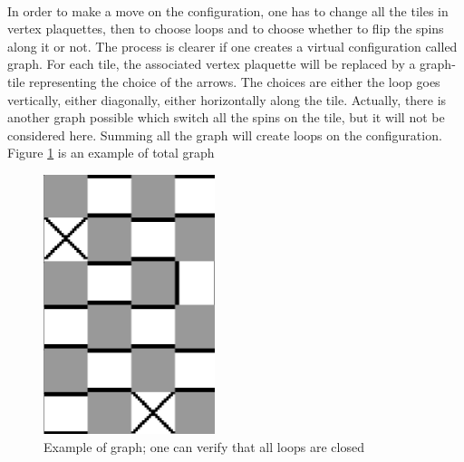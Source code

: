 \documentclass[a4paper,12pt,twoside]{article}
\begin{document}
	\paragraph{}
	In order to make a move on the configuration, one has to change all the tiles in vertex plaquettes, then to choose loops and to choose whether to flip the spins along it or not. The process is clearer if one creates a virtual configuration called graph. For each tile, the associated vertex plaquette will be replaced by a graph-tile representing the choice of the arrows. The choices are either the loop goes vertically, either diagonally, either horizontally along the tile. Actually, there is another graph possible which switch all the spins on the tile, but it will not be considered here. Summing all the graph will create loops on the configuration. Figure \ref{graph_example} is an example of total graph
	\begin{figure}[!h]
		 \centering
		 \includegraphics[width = 5cm]{random_graph.png}
		 \caption{Example of graph; one can verify that all loops are closed}
		 \label{graph_example}
	\end{figure}
\end{document}
